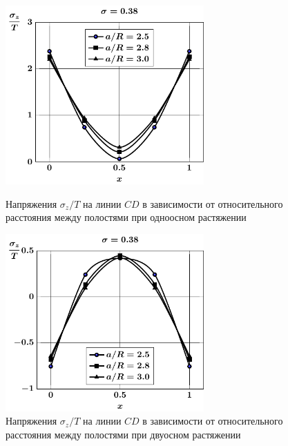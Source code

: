 \begin{russian}
\begin{figure}[h!]
\centering\footnotesize
\parbox[b]{7.5cm}{\centering\includegraphics[width=7.6cm]{spheres-cav13-a-t1-sig_z-cd.pdf}
\caption{Напряжения $\sigma_z/T$ на линии $CD$ в зависимости от относительного расстояния между полостями при одноосном растяжении
\label{f:8:48}}}\hfil\hfil
\parbox[b]{7.5cm}{\centering\includegraphics[width=7.6cm]{spheres-cav13-a-t2-sig_z-cd.pdf}
\caption{Напряжения $\sigma_z/T$ на линии $CD$ в зависимости от относительного расстояния между полостями при двуосном растяжении
\label{f:8:49}}}
\end{figure}


\end{russian}

